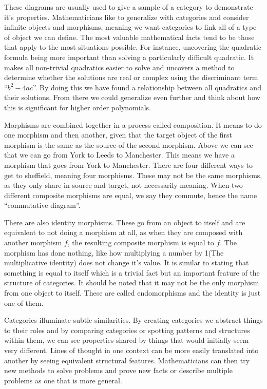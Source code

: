 \documentclass[10pt,a4paper,reqno]{amsart}
\numberwithin{figure}{section}
\begin{document}
These diagrams are usually used to give a sample of a category to demonstrate
it's properties. Mathematicians like to generalize with categories and consider
infinite objects and morphisms, meaning we want categories to link all of a type
of object we can define. The most valuable mathematical facts tend to be those
that apply to the most situations possible. For instance, uncovering the
quadratic formula being more important than solving a particularly difficult
quadratic. It makes all non-trivial quadratics easier to solve and uncovers a
method to determine whether the solutions are real or complex using the discriminant
term ``$b^2-4ac$''. By doing this we have found a relationship between all
quadratics and their solutions. From there we could generalize even further
and think about how this is significant for higher order polynomials. 

Morphisms are combined together in a process called composition. It means to do
one morphism and then another, given that the target object of the first
morphism is the same as the source of the second morphism. Above we can see
that we can go from York to Leeds to Manchester. This means we have a morphism
that goes from York to Manchester. There are four different ways to get to 
sheffield, meaning four morphisms. These may not be the same morphisms, as they only
share in source and target, not necessarily meaning. When two different composite
morphisms are equal, we say they commute, hence the name ``commutative diagram''.

There are also identity morphisms. These go from an object to itself and are
equivalent to not doing a morphism at all, as when they are composed with
another morphism $f$, the resulting composite morphism is equal to $f$. The
morphism has done nothing, like how multiplying a number by 1(The multiplicative
identity) does not change it's value. It is similar to stating that something
is equal to itself which is a trivial fact but an important feature of the
structure of categories. It should be noted that it may not be the only
morphism from one object to itself. These are called endomorphisms and the
identity is just one of them.

Categories illuminate subtle similarities.
By creating categories we abstract things to their roles and by
comparing categories or spotting patterns and structures within them, we can see
properties shared by things that would initially seem very different. Lines of
thought in one context can be more easily translated into another by seeing
equivalent structural features. Mathematicians can then try new methods to
solve problems and prove new facts or describe multiple problems as one that is
more general.
\end{document}
